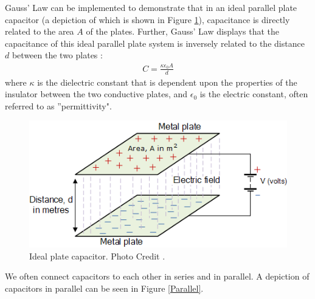 \documentclass[oneside,12pt]{amsart}
\begin{document}
	\indent Gauss’ Law can be implemented to demonstrate that in an ideal parallel plate capacitor (a depiction of which is shown in Figure \ref{Ideal}), capacitance is directly related to the area $A$ of the plates. Further, Gauss’ Law displays that the capacitance of this ideal parallel plate system is inversely related to the distance $d$ between the two plates \cite{parallel}: 
	\begin{align*}
		C = \frac{\kappa \epsilon _{0}A}{d}
	\end{align*}
	where  $\kappa$ is the dielectric constant that is dependent upon the properties of the insulator between the two conductive plates, and $\epsilon_0$ is the electric constant, often referred to as ''permittivity".\\
	\begin{figure}[H]
		\includegraphics[width=\smallgraph,scale=0.01]{IdealCapacitor.png}
		\caption{Ideal plate capacitor. Photo Credit \cite{ideal}.}
		\label{Ideal}
	\end{figure}

	\indent We often connect capacitors to each other in series and in parallel. A depiction of capacitors in parallel can be seen in Figure \ref{Parallel}.\\
	 
\end{document}
